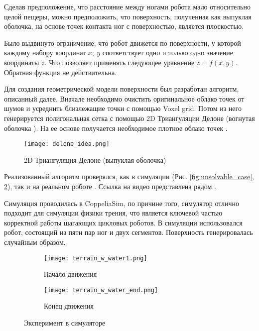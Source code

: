 Сделав предположение, что расстояние между ногами робота мало относительно целой пещеры, можно предположить, что поверхность, полученная как выпуклая оболочка, на основе точек контакта ног с поверхностью, является плоскостью.

Было выдвинуто ограничение, что робот движется по поверхности, у которой каждому набору координат $x,\ y$ соответствует одно и только одно значение координаты $z$. Что позволяет применять следующее уравнение $z=f(x,y)$. Обратная функция не действительна.

Для создания геометрической модели поверхности был разработан алгоритм, описанный далее. Вначале необходимо очистить оригинальное облако точек от шумов и усреднить близлежащие точки с помощью Voxel grid. Потом из него генерируется полигональная сетка с помощью 2D Триангуляции Делоне  (вогнутая оболочка ). На ее основе получается необходимое плотное облако точек .

\begin{figure}[H]
    \centering\texttt{[image: delone\_idea.png]}
    \caption{2D Триангуляция Делоне (выпуклая оболочка)}
    \label{fig:delone_idea.png}
\end{figure}

Реализованный алгоритм проверялся, как в симуляции (Рис. \ref{fig:unsolvable_case}, \ref{fig:start_end_exp}), так и на реальном роботе . Ссылка на видео представлена рядом \quad {}.

Симуляция проводилась в CoppeliaSim, по причине того, симулятор отлично подходит для симуляции физики трения, что является ключевой частью корректной работы шагающих цикловых роботов. В симуляции использовался робот, состоящий из пяти пар ног и двух сегментов. Поверхность генерировалась случайным образом.


\begin{figure}[H]
    \begin{subfigure}[t]{0.99\textwidth}
        \centering\texttt{[image: terrain\_w\_water1.png]}
        \caption{Начало движения}
    \end{subfigure}

    \begin{subfigure}[t]{0.99\textwidth}
        \centering\texttt{[image: terrain\_w\_water\_end.png]}
        \caption{Конец движения}
    \end{subfigure}
    \caption{Эксперимент в симуляторе}
    \label{fig:start_end_exp}
\end{figure}


